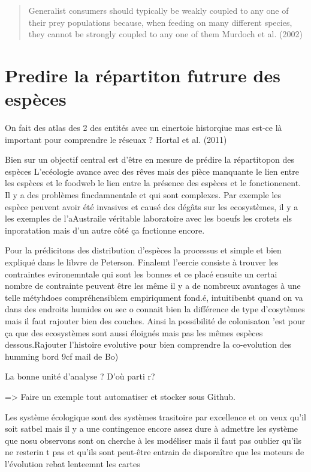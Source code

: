 \begin{quote}
Generalist consumers should typically be weakly coupled to any one of
their prey populations because, when feeding on many different species,
they cannot be strongly coupled to any one of them Murdoch et al. (2002)
\end{quote}

\section{Predire la répartiton futrure des
espèces}\label{predire-la-ruxe9partiton-futrure-des-espuxe8ces}

On fait des atlas des 2 des entités avec un einertoie historqiue mas
est-ce là important pour comprendre le réseuax ? Hortal et al. (2011)

Bien sur un objectif central est d'être en mesure de prédire la
répartitopon des espèces L'ecéologie avance avec des rêves mais des
pièce manquante le lien entre les espèces et le foodweb le lien entre la
présence des espèces et le fonctionenent. Il y a des problèmes
fincdamnentale et qui sont complexes. Par exemple les espèce peuvent
avoir été invasives et causé des dégâts sur les ecosystèmes, il y a les
exemples de l'aAustraile véritable laboratoire avec les boeufs les
crotets els inporatation mais d'un autre côté ça fnctionne encore.

Pour la prédicitons des distribution d'espèces la processus et simple et
bien expliqué dans le libvre de Peterson. Finalemt l'eercie consiste à
trouver les contraintes evironemntale qui sont les bonnes et ce placé
ensuite un certai nombre de contrainte peuvent être les même il y a de
nombreux avantages à une telle métyhdoes compréhensiblem empiriqument
fond.é, intuitibenbt quand on va dans des endroits humides ou sec o
connait bien la différence de type d'cosytèmes mais il faut rajouter
bien des couches. Ainsi la possibilité de colonisaton 'est pour ça que
des ecosystèmes sont aussi éloignés mais pas les mêmes espèces
dessous.Rajouter l'histoire evolutive pour bien comprendre la
co-evolution des humming bord 9cf mail de Bo)

La bonne unité d'analyse ? D'où parti r?

=\textgreater{} Faire un exemple tout automatiser et stocker sous
Github.

Les système écologique sont des systèmes trasitoire par excellence et on
veux qu'il soit satbel mais il y a une contingence encore assez dure à
admettre les système que nosu observons sont on cherche à les modéliser
mais il faut pas oublier qu'ils ne resterin t pas et qu'ils sont
peut-être entrain de disporaître que les moteurs de l'évolution rebat
lenteemnt les cartes

